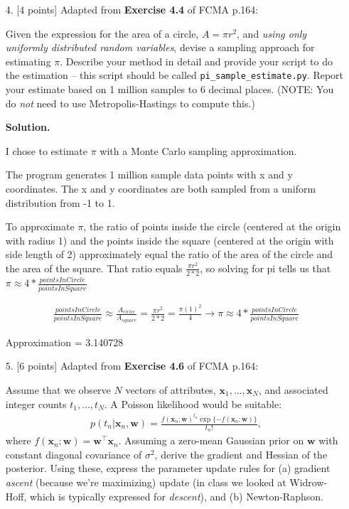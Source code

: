 \documentclass[10pt]{article}
\begin{document}
\begin{itemize}
\item[4.]  [4 points]
Adapted from {\bf Exercise 4.4} of FCMA p.164:

Given the expression for the area of a circle, $A = \pi r^2$, and {\em using only uniformly distributed random variables}, devise a sampling approach for estimating $\pi$.  Describe your method in detail and provide your script to do the estimation -- this script should be called {\tt pi\_sample\_estimate.py}.  Report your estimate based on 1 million samples to 6 decimal places.  (NOTE: You do {\em not} need to use Metropolis-Hastings to compute this.)

{\bf Solution.} %

I chose to estimate $\pi$ with a Monte Carlo sampling approximation. 

The program generates 1 million sample data points with x and y coordinates. The x and y coordinates are both sampled from a uniform distribution from -1 to 1. 

To approximate $\pi$, the ratio of points inside the circle (centered at the origin with radius 1) and the points inside the square (centered at the origin with side length of 2) approximately equal the ratio of the area of the circle and the area of the square. That ratio equals $\frac{\pi r^2}{2*2}$, so solving for pi tells us that $\pi \approx 4 * \frac{pointsInCircle}{pointsInSquare}$

\begin{align*}
    \frac{pointsInCircle}{pointsInSquare} \approx
    \frac{A_{cirlce}}{A_{square}} =
    \frac{\pi r^2}{2*2} =
    \frac{\pi (1)^2}{4} \xrightarrow[]{}
    \pi \approx 4 * \frac{pointsInCircle}{pointsInSquare}
\end{align*}

Approximation = 3.140728



\item[5.]  [6 points]
Adapted from {\bf Exercise 4.6} of FCMA p.164:

Assume that we observe $N$ vectors of attributes, $\mathbf{x}_1, ..., \mathbf{x}_N$, and associated integer counts $t_1, ..., t_N$.  A Poisson likelihood would be suitable:
\begin{eqnarray*}
p(t_n | \mathbf{x}_n, \mathbf{w}) = \frac{f(\mathbf{x}_n; \mathbf{w})^{t_n} \exp \{ -f(\mathbf{x}_n; \mathbf{w}) \}}{t_n!},
\end{eqnarray*}
where $f(\mathbf{x}_n;\mathbf{w}) = \mathbf{w}^\top\mathbf{x}_n$.
Assuming a zero-mean Gaussian prior on $\mathbf{w}$ with constant diagonal covariance of $\sigma^2$, derive the gradient and Hessian of the posterior.  Using these, express the parameter update rules for (a) gradient {\em ascent} (because we're maximizing) update (in class we looked at Widrow-Hoff, which is typically expressed for {\em descent}), and (b) Newton-Raphson.


\end{itemize}
\end{document}
